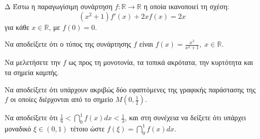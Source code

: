 \begin{thema}{Δ}
Έστω η παραγωγίσιμη συνάρτηση $f: \mathbb{R} \to \mathbb{R}$ η οποία ικανοποιεί τη σχέση:
\[ (x^2 + 1) f'(x) + 2x f(x) = 2x \]
για κάθε $x \in \mathbb{R}$, με $f(0) = 0$.
\begin{erwthma}
    \item Να αποδείξετε ότι ο τύπος της συνάρτησης $f$ είναι $\displaystyle f(x) = \frac{x^2}{x^2+1}, \; x \in \mathbb{R}$.
    \item Να μελετήσετε την $f$ ως προς τη μονοτονία, τα τοπικά ακρότατα, την κυρτότητα και τα σημεία καμπής.
    \item Να αποδείξετε ότι υπάρχουν ακριβώς δύο εφαπτόμενες της γραφικής παράστασης της $f$ οι οποίες διέρχονται από το σημείο $\displaystyle M\left(0, \frac{1}{2}\right)$.
    \item Να αποδείξετε ότι $\displaystyle \frac{1}{6} < \dint_0^1 f(x) dx < \frac{1}{3}$, και στη συνέχεια να δείξετε ότι υπάρχει μοναδικό $\xi \in (0, 1)$ τέτοιο ώστε $\displaystyle f(\xi) = \dint_0^1 f(x)dx$.
\end{erwthma}
\end{thema}
